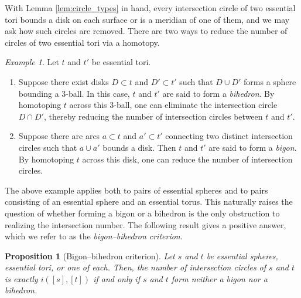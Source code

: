\documentclass[12pt,a4paper]{amsart}
\numberwithin{equation}{section}
\theoremstyle{plain}
\newtheorem{proposition}[theorem]{Proposition}
\theoremstyle{definition}
\theoremstyle{remark}
\newtheorem{example}[theorem]{Example}
\begin{document}
With Lemma \ref{lem:circle_types} in hand, every intersection circle of two essential tori bounds a disk on each surface or is a meridian of one of them, and we may ask how such circles are removed.
There are two ways to reduce the number of circles of two essential tori via a homotopy.

\begin{example}
    Let $t$ and $t'$ be essential tori.
    \begin{enumerate}
        \item Suppose there exist disks $D \subset t$ and $D' \subset t'$ such that $D \cup D'$ forms a sphere bounding a $3$-ball. In this case, $t$ and $t'$ are said to form a \emph{bihedron}. By homotoping $t$ across this $3$-ball, one can eliminate the intersection circle $D \cap D'$, thereby reducing the number of intersection circles between $t$ and $t'$.

        \item Suppose there are arcs $a \subset t$ and $a' \subset t'$ connecting two distinct intersection circles such that $a \cup a'$ bounds a disk. Then $t$ and $t'$ are said to form a \emph{bigon}. By homotoping $t$ across this disk, one can reduce the number of intersection circles.
    \end{enumerate}
\end{example}

The above example applies both to pairs of essential spheres and to pairs consisting of an essential sphere and an essential torus.
This naturally raises the question of whether forming a bigon or a bihedron is the only obstruction to realizing the intersection number.
The following result gives a positive answer, which we refer to as the \emph{bigon--bihedron criterion}.

\begin{proposition}[Bigon--bihedron criterion] \label{prop:bigon-bihedron}
    Let \(s\) and \(t\) be essential spheres, essential tori, or one of each.
    Then, the number of intersection circles of $s$ and $t$ is exactly $i([s], [t])$ if and only if $s$ and $t$ form neither a bigon nor a bihedron.
\end{proposition}
\end{document}
